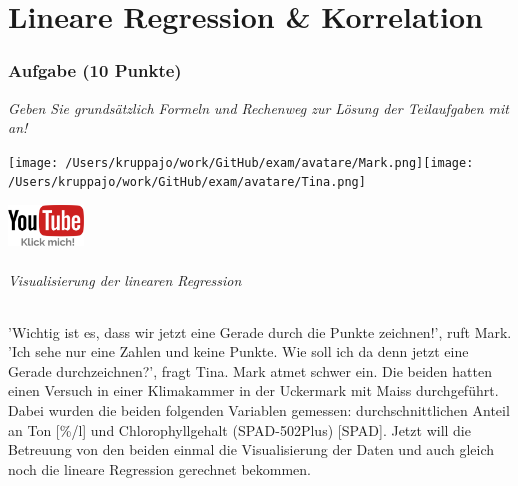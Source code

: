 \documentclass[a4paper, 9pt]{scrartcl}\usepackage[]{graphicx}\usepackage[]{xcolor}
\begin{document}
 





 
\clearpage
\part{Lineare Regression \& Korrelation}

\section{Aufgabe \hfill (10 Punkte)}

\textit{Geben Sie grundsätzlich Formeln und Rechenweg zur Lösung der Teilaufgaben mit an!} \\[1Ex]
 

 
\begin{minipage}[t]{0.5\textwidth}
\texttt{[image: /Users/kruppajo/work/GitHub/exam/avatare/Mark.png]}\hspace{-4mm}\texttt{[image: /Users/kruppajo/work/GitHub/exam/avatare/Tina.png]}
\end{minipage}
\begin{minipage}[t]{0.5\textwidth}
\hfill
\href{https://youtu.be/kHmfEmU6lrk}{\includegraphics[width = 2cm]{img/youtube}}
\end{minipage}



\paragraph{Visualisierung der linearen Regression}

'Wichtig ist es, dass wir jetzt eine Gerade durch die Punkte zeichnen!', ruft Mark. 'Ich sehe nur eine Zahlen und keine Punkte. Wie soll ich da denn jetzt eine Gerade durchzeichnen?', fragt Tina. Mark atmet schwer ein. Die beiden hatten einen Versuch in einer Klimakammer in der Uckermark mit Maiss durchgeführt. Dabei wurden die beiden folgenden Variablen gemessen: durchschnittlichen Anteil an Ton [\%/l] und Chlorophyllgehalt (SPAD-502Plus) [SPAD]. Jetzt will die Betreuung von den beiden einmal die Visualisierung der Daten und auch gleich noch die lineare Regression gerechnet bekommen.
\end{document}
